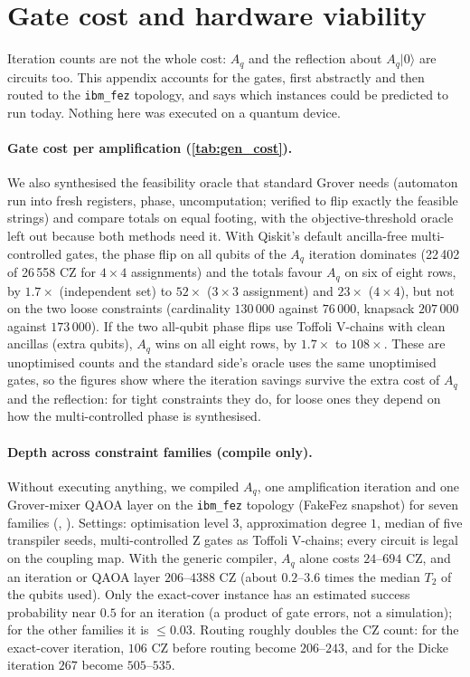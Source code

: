 \section{Gate cost and hardware viability}\label{sec:hardware}

Iteration counts are not the whole cost: $A_q$ and the reflection about $A_q|0\rangle$ are circuits too. This appendix accounts for the gates, first abstractly and then routed to the \texttt{ibm\_fez} topology, and says which instances could be predicted to run today. Nothing here was executed on a quantum device.

\paragraph{Gate cost per amplification (\cref{tab:gen_cost}).} We also synthesised the feasibility oracle that standard Grover needs (automaton run into fresh registers, phase, uncomputation; verified to flip exactly the feasible strings) and compare totals on equal footing, with the objective-threshold oracle left out because both methods need it. With Qiskit's default ancilla-free multi-controlled gates, the phase flip on all qubits of the $A_q$ iteration dominates (22\,402 of 26\,558 CZ for $4\times4$ assignments) and the totals favour $A_q$ on six of eight rows, by $1.7\times$ (independent set) to $52\times$ ($3\times3$ assignment) and $23\times$ ($4\times4$), but not on the two loose constraints (cardinality $130\,000$ against $76\,000$, knapsack $207\,000$ against $173\,000$). If the two all-qubit phase flips use Toffoli V-chains with clean ancillas (extra qubits), $A_q$ wins on all eight rows, by $1.7\times$ to $108\times$. These are unoptimised counts and the standard side's oracle uses the same unoptimised gates, so the figures show where the iteration savings survive the extra cost of $A_q$ and the reflection: for tight constraints they do, for loose ones they depend on how the multi-controlled phase is synthesised.

\paragraph{Depth across constraint families (compile only).}\label{sec:general-depth} Without executing anything, we compiled $A_q$, one amplification iteration and one Grover-mixer QAOA layer on the \texttt{ibm\_fez} topology (FakeFez snapshot) for seven families (, ). Settings: optimisation level 3, approximation degree $1$, median of five transpiler seeds, multi-controlled Z gates as Toffoli V-chains; every circuit is legal on the coupling map. With the generic compiler, $A_q$ alone costs $24$--$694$ CZ, and an iteration or QAOA layer $206$--$4388$ CZ (about $0.2$--$3.6$ times the median $T_2$ of the qubits used). Only the exact-cover instance has an estimated success probability near $0.5$ for an iteration (a product of gate errors, not a simulation); for the other families it is $\le0.03$. Routing roughly doubles the CZ count: for the exact-cover iteration, $106$ CZ before routing become $206$--$243$, and for the Dicke iteration $267$ become $505$--$535$.

